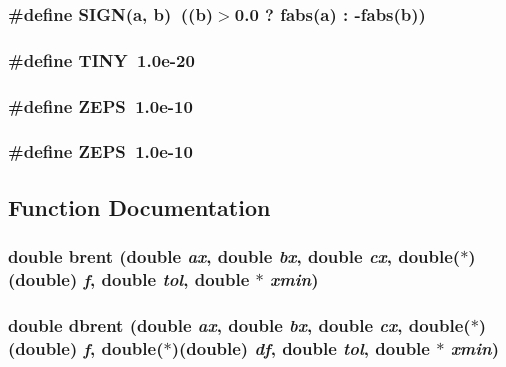 \subsubsection{\setlength{\rightskip}{0pt plus 5cm}\#define SIGN(a, b)~((b)$>$0.0 ? fabs(a) : -fabs(b))}\label{nrmin_8c_c89d5f8a358eb8a1abdcd0fcef134f1a}


\subsubsection{\setlength{\rightskip}{0pt plus 5cm}\#define TINY~1.0e-20}\label{nrmin_8c_cf1c38f71f39386356edb151a131ad11}


\subsubsection{\setlength{\rightskip}{0pt plus 5cm}\#define ZEPS~1.0e-10}\label{nrmin_8c_1480be118a74bd98a735eecc3ee0e833}


\subsubsection{\setlength{\rightskip}{0pt plus 5cm}\#define ZEPS~1.0e-10}\label{nrmin_8c_1480be118a74bd98a735eecc3ee0e833}




\subsection{Function Documentation}
\subsubsection{\setlength{\rightskip}{0pt plus 5cm}double brent (double {\em ax}, double {\em bx}, double {\em cx}, double($\ast$)(double) {\em f}, double {\em tol}, double $\ast$ {\em xmin})}\label{nrmin_8c_4fd8796511d2de86aee49722d758b5b6}


\subsubsection{\setlength{\rightskip}{0pt plus 5cm}double dbrent (double {\em ax}, double {\em bx}, double {\em cx}, double($\ast$)(double) {\em f}, double($\ast$)(double) {\em df}, double {\em tol}, double $\ast$ {\em xmin})}\label{nrmin_8c_20797fbea3a5ab0b6e501ad5752405fb}


